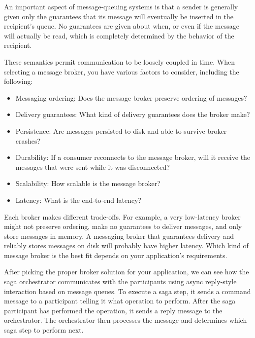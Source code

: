\documentclass[conference]{IEEEtran}
\begin{document}
An important aspect of message-queuing systems is that a sender is generally given only the guarantees that its message will eventually be inserted in the recipient’s queue. No guarantees are given about when, or even if the message will actually be read, which is completely determined by the behavior of the recipient.

These semantics permit communication to be loosely coupled in time. When selecting a message broker, you have various factors to consider, including the following:

\begin{itemize}
  \item Messaging ordering: Does the message broker preserve ordering of messages?
  \item Delivery guarantees: What kind of delivery guarantees does the broker make?
  \item Persistence: Are messages persisted to disk and able to survive broker crashes?
  \item Durability: If a consumer reconnects to the message broker, will it receive the messages that were sent while it was disconnected?
  \item Scalability: How scalable is the message broker?
  \item Latency: What is the end-to-end latency?
\end{itemize}

Each broker makes different trade-offs. For example, a very low-latency broker might not preserve ordering, make no guarantees to deliver messages, and only store messages in memory. A messaging broker that guarantees delivery and reliably stores messages on disk will probably have higher latency. Which kind of message broker is the best fit depends on your application’s requirements. 

After picking the proper broker solution for your application, we can see how the saga orchestrator communicates with the participants using async reply-style interaction based on message queues. To execute a saga step, it sends a command message to a participant telling it what operation to perform. After the saga participant has performed the operation, it sends a reply message to the orchestrator. The orchestrator then processes the message and determines which saga step to perform next.
\end{document}
